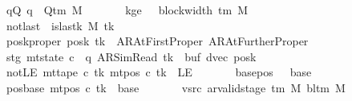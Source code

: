 \begin{isabellebody}
\ \ \ \ \ \ \ qQ{\isacharcolon}{\kern0pt}\ {\isachardoublequoteopen}q\ {\isasymin}\ Q{\isacharunderscore}{\kern0pt}tm\ M{\isachardoublequoteclose}\isanewline
\ \ \ \ \ \ \ kge{}{\isacharcolon}{\kern0pt}\ {\isachardoublequoteopen}{}\ {\isasymle}\ block{\isacharunderscore}{\kern0pt}width\ {\isacharparenleft}{\kern0pt}{\isasymGamma}{\isacharunderscore}{\kern0pt}tm\ M{\isacharparenright}{\kern0pt}{\isachardoublequoteclose}\isanewline
\ \ \ \ \ \ \ notlast{\isacharcolon}{\kern0pt}\ {\isachardoublequoteopen}{\isasymnot}\ is{\isacharunderscore}{\kern0pt}last{\isacharunderscore}{\kern0pt}k\ M\ tk{\isachardoublequoteclose}\isanewline
\ \ \ \ \ \ \ posk{\isacharunderscore}{\kern0pt}proper{\isacharcolon}{\kern0pt}\ {\isachardoublequoteopen}posk\ tk\ {\isasymin}\ {\isacharbraceleft}{\kern0pt}AR{\isacharunderscore}{\kern0pt}AtFirstProper{\isacharcomma}{\kern0pt}\ AR{\isacharunderscore}{\kern0pt}AtFurtherProper{\isacharbraceright}{\kern0pt}{\isachardoublequoteclose}\isanewline
\ \ \ \ \ \ \ stg{\isacharcolon}{\kern0pt}\ {\isachardoublequoteopen}mt{\isacharunderscore}{\kern0pt}state\ c{\isacharprime}{\kern0pt}\ {\isacharequal}{\kern0pt}\ {\isacharparenleft}{\kern0pt}q{\isacharcomma}{\kern0pt}\ AR{\isacharunderscore}{\kern0pt}SimRead{\isacharcomma}{\kern0pt}\ tk{\isacharcomma}{\kern0pt}\ {}{\isacharcomma}{\kern0pt}\ buf{\isacharcomma}{\kern0pt}\ dvec{\isacharcomma}{\kern0pt}\ posk{\isacharparenright}{\kern0pt}{\isachardoublequoteclose}\isanewline
\ \ \ \ \ \ \ notLE{\isacharcolon}{\kern0pt}\ {\isachardoublequoteopen}mt{\isacharunderscore}{\kern0pt}tape\ c{\isacharprime}{\kern0pt}\ tk\ {\isacharparenleft}{\kern0pt}mt{\isacharunderscore}{\kern0pt}pos\ c{\isacharprime}{\kern0pt}\ tk{\isacharparenright}{\kern0pt}\ {\isasymnoteq}\ LE{}{\isachardoublequoteclose}\isanewline
\ \ \ \ \ \ \ base{\isacharunderscore}{\kern0pt}pos{\isacharcolon}{\kern0pt}\ {\isachardoublequoteopen}{}\ {\isacharless}{\kern0pt}\ base{\isachardoublequoteclose}\isanewline
\ \ \ \ \ \ \ pos{\isacharunderscore}{\kern0pt}base{\isacharcolon}{\kern0pt}\ {\isachardoublequoteopen}mt{\isacharunderscore}{\kern0pt}pos\ c{\isacharprime}{\kern0pt}\ tk\ {\isacharequal}{\kern0pt}\ base{\isachardoublequoteclose}\isanewline
\ \ \ \ \ \ \ vsrc{\isacharcolon}{\kern0pt}\ {\isachardoublequoteopen}ar{\isacharunderscore}{\kern0pt}valid{\isacharunderscore}{\kern0pt}stage\ {\isacharparenleft}{\kern0pt}{\isasymGamma}{\isacharunderscore}{\kern0pt}tm\ M{\isacharparenright}{\kern0pt}\ {\isacharparenleft}{\kern0pt}bl{\isacharunderscore}{\kern0pt}tm\ M{\isacharparenright}{\kern0pt}\isanewline

\end{isabellebody}
